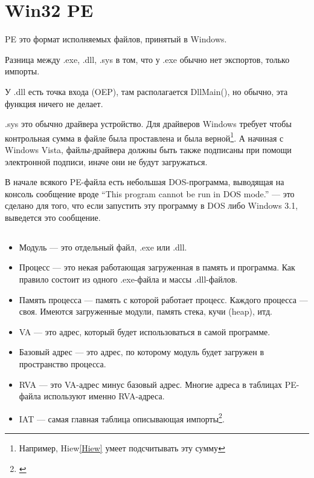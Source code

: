 \section{Win32 PE}

PE это формат исполняемых файлов, принятый в Windows.

Разница между .exe, .dll, .sys в том, что у .exe обычно нет экспортов, только импорты.

У .dll есть точка входа (\ac{OEP}), там располагается DllMain(), но обычно, эта
функция ничего не делает.

.sys это обычно драйвера устройство. Для драйверов Windows требует чтобы контрольная сумма в файле была проставлена
и была верной\footnote{Например, Hiew\ref{Hiew} умеет подсчитывать эту сумму}.
А начиная с Windows Vista, файлы-драйвера должны быть также подписаны при помощи электронной подписи, 
иначе они не будут загружаться.

В начале всякого PE-файла есть небольшая DOS-программа, выводящая на консоль сообщение вроде ``This program cannot be run in DOS mode.'' --- 
это сделано для того, что если запустить эту программу в DOS либо Windows 3.1, выведется это сообщение.

\subsection{}

\begin{itemize}
\item
Модуль --- это отдельный файл, .exe или .dll.

\item
Процесс --- это некая работающая загруженная в память и программа. Как правило состоит из одного .exe-файла и массы
.dll-файлов.

\item
Память процесса --- память с которой работает процесс. Каждого процесса --- своя. Имеются загруженные модули, память
стека, кучи (heap), итд.

\item
\ac{VA} --- это адрес, который будет использоваться в самой программе.

\item
Базовый адрес --- это адрес, по которому модуль будет загружен в пространство процесса.

\item
\ac{RVA} --- это VA-адрес минус базовый адрес. Многие адреса в таблицах PE-файла используют именно \ac{RVA}-адреса.

\item
\ac{IAT} --- самая главная таблица описывающая импорты\footnote{\cite{Pietrek1}}.
\end{itemize}


